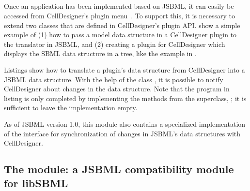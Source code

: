 \subsection{}

Once an application has been implemented based on JSBML, it can easily be
accessed from CellDesigner's plugin menu~\citep{Funahashi2003}. To support
this, it is necessary to extend two classes that are defined in
CellDesigner's plugin API. 
show a simple example of (1) how to pass a model
data structure in a CellDesigner plugin to the translator in JSBML, and (2)
creating a plugin for CellDesigner which displays the SBML data structure
in a tree, like the example in .

\clearpage
{}

Listings  show how to translate a
plugin's data structure from CellDesigner into a JSBML data structure. With
the help of the class \PluginSBMLWriter, it is possible to notify
CellDesigner about changes in the data structure. Note that the program in
listing  is only completed by implementing the methods from the
superclass, ; it is sufficient to leave the
implementation empty.

As of JSBML version 1.0, this module also contains a specialized
implementation of the \TreeNodeChangeListener{} interface for
synchronization of changes in JSBML's data structures with CellDesigner.

\clearpage


\clearpage

\subsection{The  module: a JSBML compatibility
  module for libSBML}


